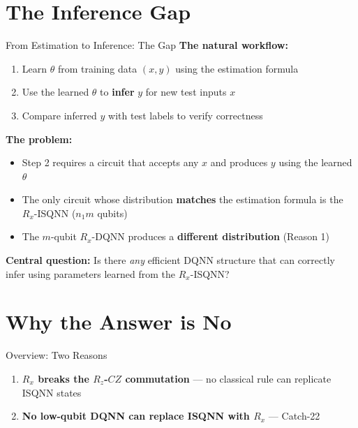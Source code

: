 \documentclass[aspectratio=169]{beamer}
\begin{document}
\section{The Inference Gap}

\begin{frame}{From Estimation to Inference: The Gap}
  \small
  \textbf{The natural workflow:}
  \begin{enumerate}
    \item Learn $\theta$ from training data $(x,y)$ using the estimation formula
    \item Use the learned $\theta$ to \textbf{infer} $y$ for new test inputs $x$
    \item Compare inferred $y$ with test labels to verify correctness
  \end{enumerate}

  \vspace{0.3em}
  \textbf{The problem:}
  \begin{itemize}
    \item Step 2 requires a circuit that accepts any $x$ and produces $y$ using the learned $\theta$
    \item The only circuit whose distribution \textbf{matches} the estimation formula is the $R_x$-ISQNN ($n_1m$ qubits)
    \item The $m$-qubit $R_x$-DQNN produces a \textbf{different distribution} (Reason 1)
  \end{itemize}

  \vspace{0.3em}
  \textbf{Central question:} Is there \emph{any} efficient DQNN structure that can correctly infer using parameters learned from the $R_x$-ISQNN?
\end{frame}

\section{Why the Answer is No}

\begin{frame}{Overview: Two Reasons}
  \begin{enumerate}
    \item \textbf{$R_x$ breaks the $R_z$-$CZ$ commutation} --- no classical rule can replicate ISQNN states
    \item \textbf{No low-qubit DQNN can replace ISQNN with $R_x$} --- Catch-22
  \end{enumerate}
\end{frame}
\end{document}
